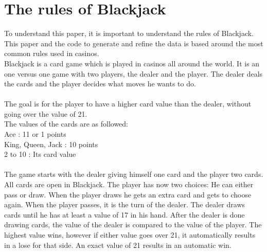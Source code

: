 \section{The rules of Blackjack}
To understand this paper, it is important to understand the rules of Blackjack. This paper and the code to generate and refine the data is based around the most common rules used in casinos. \\
Blackjack is a card game which is played in casinos all around the world. It is an one versus one game with two players, the dealer and the player. The dealer deals the cards and the player decides what moves he wants to do. \\
 \\
The goal is for the player to have a higher card value than the dealer, without going over the value of 21. \\ 
The values of the cards are as followed: \\
Ace : 11 or 1 points \\
King, Queen, Jack : 10 points \\
2 to 10 : Its card value \\
 \\
The game starts with the dealer giving himself one card and the player two cards. All cards are open in Blackjack. The player has now two choices: He can either pass or draw. When the player draws he gets an extra card and gets to choose again. When the player passes, it is the turn of the dealer. The dealer draws cards until he has at least a value of 17 in his hand. After the dealer is done drawing cards, the value of the dealer is compared to the value of the player. The highest value wins, however if either value goes over 21, it automatically results in a lose for that side. An exact value of 21 results in an automatic win. 